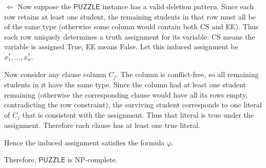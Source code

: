\smallskip
\noindent
\(\Leftarrow\)
Now suppose the \(\mathsf{PUZZLE}\) instance has a valid deletion pattern.
Since each row retains at least one student,
the remaining students in that row must all be of the same type
(otherwise some column would contain both CS and EE).
Thus each row uniquely determines a truth assignment for its variable:
CS means the variable is assigned True, EE means False.
Let this induced assignment be \(x_1^*,\dots,x_n^*\).

Now consider any clause column \(C_j\).
The column is conflict-free, so all remaining students in it have the same type.
Since the column had at least one student remaining
(otherwise the corresponding clause would have all its rows empty,
contradicting the row constraint), the surviving student corresponds
to one literal of \(C_j\) that is consistent with the assignment.
Thus that literal is true under the assignment.
Therefore each clause has at least one true literal.

Hence the induced assignment satisfies the formula \(\varphi\).

Therefore,  \(\mathsf{PUZZLE}\) is NP-complete.
\newpage